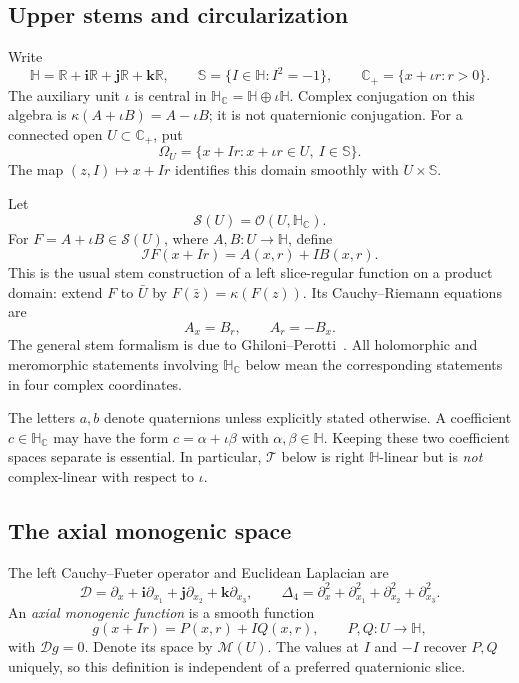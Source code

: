 \documentclass[11pt,a4paper]{article}
\numberwithin{equation}{section}
\theoremstyle{definition}
\theoremstyle{remark}
\newcommand{\R}{\mathbb R}
\newcommand{\C}{\mathbb C}
\newcommand{\HH}{\mathbb H}
\newcommand{\HC}{\mathbb H_{\C}}
\newcommand{\SSS}{\mathbb S}
\newcommand{\Cp}{\C_+}
\newcommand{\cS}{\mathscr S}
\newcommand{\cM}{\mathscr M}
\newcommand{\cI}{\mathcal I}
\newcommand{\cD}{\mathcal D}
\newcommand{\lap}{\Delta_4}
\newcommand{\T}{\mathcal T}
\begin{document}
\subsection{Upper stems and circularization}
Write
\[
 \HH=\R+\mathbf i\R+\mathbf j\R+\mathbf k\R,
 \qquad \SSS=\{I\in\HH:I^2=-1\},\qquad
 \Cp=\{x+\iota r:r>0\}.
\]
The auxiliary unit $\iota$ is central in
$\HC=\HH\oplus\iota\HH$. Complex conjugation on this algebra is
$\kappa(A+\iota B)=A-\iota B$; it is not quaternionic conjugation.
For a connected open $U\subset\Cp$, put
\[
 \Omega_U=\{x+Ir:x+\iota r\in U,\ I\in\SSS\}.
\]
The map $(z,I)\mapsto x+Ir$ identifies this domain smoothly with
$U\times\SSS$.

Let
\[
 \cS(U)=\mathcal O(U,\HC).
\]
For $F=A+\iota B\in\cS(U)$, where $A,B:U\to\HH$, define
\begin{equation}
 \cI F(x+Ir)=A(x,r)+IB(x,r).
 \label{eq:slice}
\end{equation}
This is the usual stem construction of a left slice-regular function on a
product domain: extend $F$ to $\bar U$ by
$F(\bar z)=\kappa(F(z))$. Its Cauchy--Riemann equations are
\begin{equation}
 A_x=B_r,\qquad A_r=-B_x.
 \label{eq:CR}
\end{equation}
The general stem formalism is due to Ghiloni--Perotti~\cite{GP}.
All holomorphic and meromorphic statements involving $\HC$ below mean the
corresponding statements in four complex coordinates.

The letters $a,b$ denote quaternions unless explicitly stated otherwise.
A coefficient $c\in\HC$ may have the form $c=\alpha+\iota\beta$ with
$\alpha,\beta\in\HH$. Keeping these two coefficient spaces separate is
essential. In particular, $\T$ below is right $\HH$-linear but is \emph{not}
complex-linear with respect to $\iota$.

\subsection{The axial monogenic space}
The left Cauchy--Fueter operator and Euclidean Laplacian are
\[
 \cD=\partial_x+\mathbf i\partial_{x_1}
     +\mathbf j\partial_{x_2}+\mathbf k\partial_{x_3},
 \qquad \lap=\partial_x^2+\partial_{x_1}^2
                  +\partial_{x_2}^2+\partial_{x_3}^2.
\]
An \emph{axial monogenic function} is a smooth function
\begin{equation}
 g(x+Ir)=P(x,r)+IQ(x,r),\qquad P,Q:U\to\HH,
 \label{eq:axial}
\end{equation}
with $\cD g=0$. Denote its space by $\cM(U)$. The values at $I$ and $-I$
recover $P,Q$ uniquely, so this definition is independent of a preferred
quaternionic slice.
\end{document}

